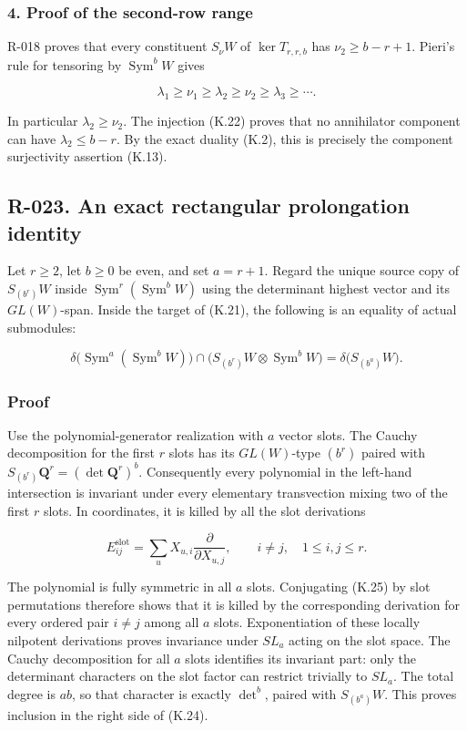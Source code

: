 \documentclass[
  10pt,
]{article}
\begin{document}
\subsubsection{4. Proof of the second-row
range}\label{proof-of-the-second-row-range}

R-018 proves that every constituent \(S_\nu W\) of \(\ker T_{r,r,b}\)
has \(\nu_2\ge b-r+1\). Pieri's rule for tensoring by
\(\operatorname{Sym}^bW\) gives

\[
\lambda_1\ge\nu_1\ge\lambda_2\ge\nu_2
\ge\lambda_3\ge\cdots.
\tag{K.23}
\]

In particular \(\lambda_2\ge\nu_2\). The injection (K.22) proves that no
annihilator component can have \(\lambda_2\le b-r\). By the exact
duality (K.2), this is precisely the component surjectivity assertion
(K.13).

\subsection{R-023. An exact rectangular prolongation
identity}\label{r-023.-an-exact-rectangular-prolongation-identity}

Let \(r\ge2\), let \(b\ge0\) be even, and set \(a=r+1\). Regard the
unique source copy of \(S_{(b^r)}W\) inside
\(\operatorname{Sym}^r(\operatorname{Sym}^bW)\) using the determinant
highest vector and its \(GL(W)\)-span. Inside the target of (K.21), the
following is an equality of actual submodules:

\[
\boxed{
\delta\bigl(\operatorname{Sym}^{a}(\operatorname{Sym}^bW)\bigr)
\cap\bigl(S_{(b^r)}W\otimes\operatorname{Sym}^bW\bigr)
=\delta\bigl(S_{(b^a)}W\bigr).}
\tag{K.24}
\]

\subsubsection{Proof}\label{proof-3}

Use the polynomial-generator realization with \(a\) vector slots. The
Cauchy decomposition for the first \(r\) slots has its \(GL(W)\)-type
\((b^r)\) paired with \(S_{(b^r)}\mathbf Q^r=(\det\mathbf Q^r)^b\).
Consequently every polynomial in the left-hand intersection is invariant
under every elementary transvection mixing two of the first \(r\) slots.
In coordinates, it is killed by all the slot derivations

\[
E_{ij}^{\mathrm{slot}}
=\sum_u X_{u,i}\frac{\partial}{\partial X_{u,j}},
\qquad i\ne j,\quad1\le i,j\le r.
\tag{K.25}
\]

The polynomial is fully symmetric in all \(a\) slots. Conjugating (K.25)
by slot permutations therefore shows that it is killed by the
corresponding derivation for every ordered pair \(i\ne j\) among all
\(a\) slots. Exponentiation of these locally nilpotent derivations
proves invariance under \(SL_a\) acting on the slot space. The Cauchy
decomposition for all \(a\) slots identifies its invariant part: only
the determinant characters on the slot factor can restrict trivially to
\(SL_a\). The total degree is \(ab\), so that character is exactly
\(\det^b\), paired with \(S_{(b^a)}W\). This proves inclusion in the
right side of (K.24).
\end{document}
